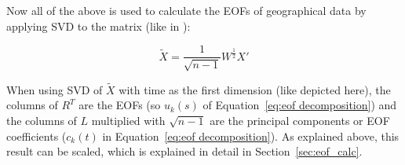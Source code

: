 Now all of the above is used to calculate the EOFs of geographical data by applying SVD to the matrix (like in ): 

\begin{equation}
  \tilde{X} = \frac{1}{\sqrt{n - 1}} W^{\frac{1}{2}} X' 
  \label{eq:complete data preperation}
\end{equation}


When using SVD of $\tilde{X}$ with time as the first dimension (like depicted here), the columns of $R^T$ are the EOFs (so $u_k(s)$ of Equation~\ref{eq:eof decomposition}) and the columns of $L$ multiplied with $\sqrt{n - 1}$ are the principal components or EOF coefficients ($c_k(t)$ in Equation~\ref{eq:eof decomposition}).
As explained above, this result can be scaled, which is explained in detail in Section~\ref{sec:eof_calc}.



